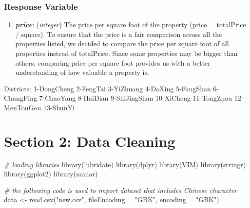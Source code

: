 \documentclass[
]{article}
\newenvironment{Shaded}{\begin{snugshade}}{\end{snugshade}}
\newcommand{\AttributeTok}[1]{\textcolor[rgb]{0.77,0.63,0.00}{#1}}
\newcommand{\CommentTok}[1]{\textcolor[rgb]{0.56,0.35,0.01}{\textit{#1}}}
\newcommand{\FunctionTok}[1]{\textcolor[rgb]{0.00,0.00,0.00}{#1}}
\newcommand{\NormalTok}[1]{#1}
\newcommand{\OtherTok}[1]{\textcolor[rgb]{0.56,0.35,0.01}{#1}}
\newcommand{\StringTok}[1]{\textcolor[rgb]{0.31,0.60,0.02}{#1}}
\providecommand{\tightlist}{%
  \setlength{\itemsep}{0pt}\setlength{\parskip}{0pt}}
\begin{document}
\hypertarget{response-variable}{%
\subsubsection{\texorpdfstring{\textbf{Response
Variable}}{Response Variable}}\label{response-variable}}

\begin{enumerate}
\def\labelenumi{\arabic{enumi}.}
\tightlist
\item
  \textbf{\emph{price}}: (\emph{integer}) The price per square foot of
  the property (price = totalPrice / square). To ensure that the price
  is a fair comparison across all the properties listed, we decided to
  compare the price per square foot of all properties instead of
  totalPrice. Since some properties may be bigger than others, comparing
  price per square foot provides us with a better understanding of how
  valuable a property is.
\end{enumerate}

Districts: 1-DongCheng 2-FengTai 3-YiZhuang 4-DaXing 5-FangShan
6-ChangPing 7-ChaoYang 8-HaiDian 9-ShiJingShan 10-XiCheng 11-TongZhou
12-MenTouGou 13-ShunYi

\hypertarget{section-2-data-cleaning}{%
\section{Section 2: Data Cleaning}\label{section-2-data-cleaning}}

\begin{Shaded}
\begin{Highlighting}[]
\CommentTok{\# loading libraries}
\FunctionTok{library}\NormalTok{(lubridate)}
\FunctionTok{library}\NormalTok{(dplyr)}
\FunctionTok{library}\NormalTok{(VIM)}
\FunctionTok{library}\NormalTok{(stringr)}
\FunctionTok{library}\NormalTok{(ggplot2)}
\FunctionTok{library}\NormalTok{(naniar)}
\end{Highlighting}
\end{Shaded}

\begin{Shaded}
\begin{Highlighting}[]
\CommentTok{\# the following code is used to import dataset that includes Chinese character}
\NormalTok{data }\OtherTok{\textless{}{-}} \FunctionTok{read.csv}\NormalTok{(}\StringTok{"new.csv"}\NormalTok{, }\AttributeTok{fileEncoding =} \StringTok{"GBK"}\NormalTok{, }\AttributeTok{encoding =} \StringTok{"GBK"}\NormalTok{)}
\end{Highlighting}
\end{Shaded}
\end{document}
